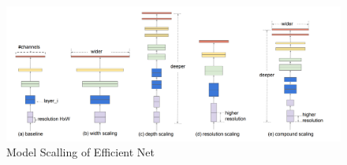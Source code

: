 \begin{figure}
    \centering
    \includegraphics[scale=0.65]{figures/efficientnetArchitecture.png}
    \caption{Model Scalling of Efficient Net \cite{tan2021efficientnetv2}}
    \label{fig:my_label}
\end{figure}

